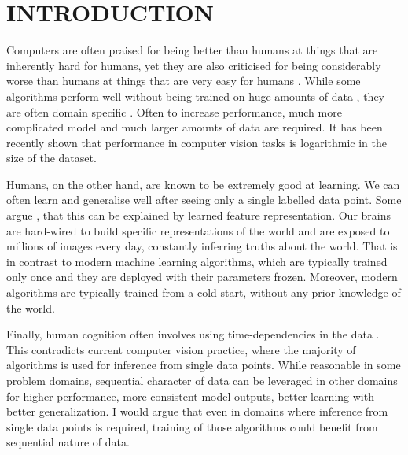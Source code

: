 \section{INTRODUCTION}

Computers are often praised for being better than humans at things that are inherently hard for humans, yet they are also  criticised for being considerably worse than humans at things that are very easy for humans . While some algorithms perform well without being trained on huge amounts of data \addref{}, they are often domain specific \addref. Often to increase performance, much more complicated model and much larger amounts of data are required. It has been recently shown \addref that performance in computer vision tasks is logarithmic in the size of the dataset. 

Humans, on the other hand, are known to be extremely good at learning. We can often learn and generalise well after seeing only a single labelled data point. Some argue \addref, that this can be explained by learned feature representation. Our brains are hard-wired to build specific representations of the world and are exposed to millions of images every day, constantly inferring truths about the world. That is in contrast to modern machine learning algorithms, which are typically trained only once and they are deployed with their parameters frozen. Moreover, modern algorithms are typically trained from a cold start, without any prior knowledge of the world.

Finally, human cognition often involves using time-dependencies in the data \addref. This contradicts current computer vision practice, where the majority of algorithms is used for inference from single data points. While reasonable in some problem domains, sequential character of data can be leveraged in other domains for higher performance, more consistent model outputs, better learning with better generalization. I would argue that even in domains where inference from single data points is required, training of those algorithms could benefit from sequential nature of data.